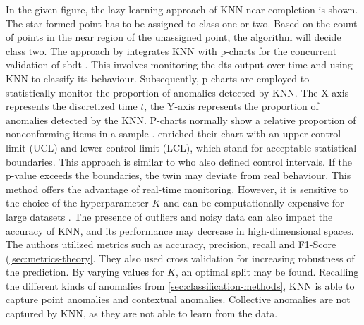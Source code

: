 In the given figure, the lazy learning approach of KNN near completion is shown. The star-formed point has to be assigned to class one or two. Based on the count of points in the near region of the unassigned point, the algorithm will decide class two.
The approach by \textcite{dos2024simulation} integrates KNN with p-charts for the concurrent validation of \gls{sbdt} \autocite{dos2024digital}. This involves monitoring the \gls{dt}s output over time and using KNN to classify its behaviour. Subsequently, p-charts are employed to statistically monitor the proportion of anomalies detected by KNN. The X-axis represents the discretized time $t$, the Y-axis represents the proportion of anomalies detected by the KNN. P-charts normally show a relative proportion of nonconforming items in a sample \autocite{acosta1999improved}. \Textcite{dos2024simulation} enriched their chart with an upper control limit (UCL) and lower control limit (LCL), which stand for acceptable statistical boundaries. This approach is similar to \textcite{Nie2023rcim} who also defined control intervals. If the p-value exceeds the boundaries, the twin may deviate from real behaviour. This method offers the advantage of real-time monitoring. However, it is sensitive to the choice of the hyperparameter $K$ and can be computationally expensive for large datasets \autocite{dos2024simulation}. The presence of outliers and noisy data can also impact the accuracy of KNN, and its performance may decrease in high-dimensional spaces. The authors utilized metrics such as accuracy, precision, recall and F1-Score (\autoref{sec:metrics-theory}. They also used cross validation for increasing robustness of the prediction. By varying values for $K$, an optimal split may be found. Recalling the different kinds of anomalies from \autoref{sec:classification-methods}, KNN is able to capture point anomalies and contextual anomalies. Collective anomalies are not captured by KNN, as they are not able to learn from the data.

